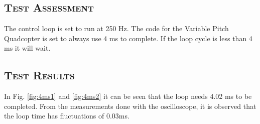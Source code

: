 \subsection*{\textsc{\medium Test Assessment}}
The control loop is set to run at 250 Hz. The code for the Variable Pitch Quadcopter is set to always use 4 ms to complete. If the loop cycle is less than 4 ms it will wait.

\subsection*{\textsc{\medium Test Results}}
In Fig. \ref{fig:4ms1} and \ref{fig:4ms2} it can be seen that the loop needs 4.02 ms to be completed. From the measurements done with the oscilloscope, it is observed that the loop time has fluctuations of \pm0.03ms.

